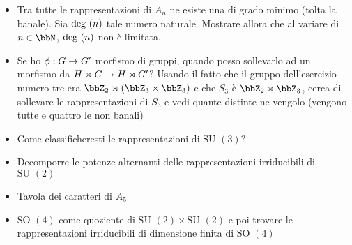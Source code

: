 \documentclass[a4paper,NoNotes,GeneralMath]{stdmdoc}
\newcommand{\SU}{\text{SU }}
\newcommand{\SO}{\text{SO }}
\begin{document}
\begin{itemize}
		\item Tra tutte le rappresentazioni di $A_n$ ne esiste una di grado minimo (tolta la banale). Sia $\mbox{deg }(n)$ tale numero naturale. Mostrare allora che al variare di $n \in \bbN$, $\mbox{deg }(n)$ non è limitata.
		\item Se ho $\phi: G \rightarrow G'$ morfismo di gruppi, quando posso sollevarlo ad un morfismo da $H \rtimes G \rightarrow H \rtimes G'$? Usando il fatto che il gruppo dell'esercizio numero tre era $\bbZ_2 \rtimes (\bbZ_3 \times \bbZ_3)$ e che $S_3$ è $\bbZ_2 \rtimes \bbZ_3$, cerca di sollevare le rappresentazioni di $S_3$ e vedi quante distinte ne vengolo (vengono tutte e quattro le non banali)
		\item Come classificheresti le rappresentazioni di $\SU(3)$?
		\item Decomporre le potenze alternanti delle rappresentazioni irriducibili di $\SU(2)$
		\item Tavola dei caratteri di $A_5$
		\item $\SO(4)$ come quoziente di $\SU(2) \times \SU(2)$ e poi trovare le rappresentazioni irriducibili di dimensione finita di $\SO(4)$
	\end{itemize}
\end{document}
